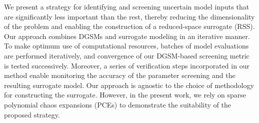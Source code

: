 %




We present a strategy for identifying and screening uncertain model inputs
that are significantly less important than the rest, thereby reducing the
dimensionality of the problem and enabling the construction of a reduced-space
surrogate (RSS).  Our approach combines DGSMs and surrogate modeling in an
iterative manner.  To make optimum use of computational resources, batches of
model evaluations are performed iteratively, and convergence of our DGSM-based
screening metric is tested successively. Moreover, a series of verification steps
incorporated in our method enable monitoring the accuracy of the parameter 
screening
and the resulting surrogate model.  Our approach is agnostic to the choice of
methodology for constructing the surrogate. However, in the present work, we
rely on sparse polynomial chaos expansions (PCEs) 
to demonstrate the suitability of the proposed strategy.  

